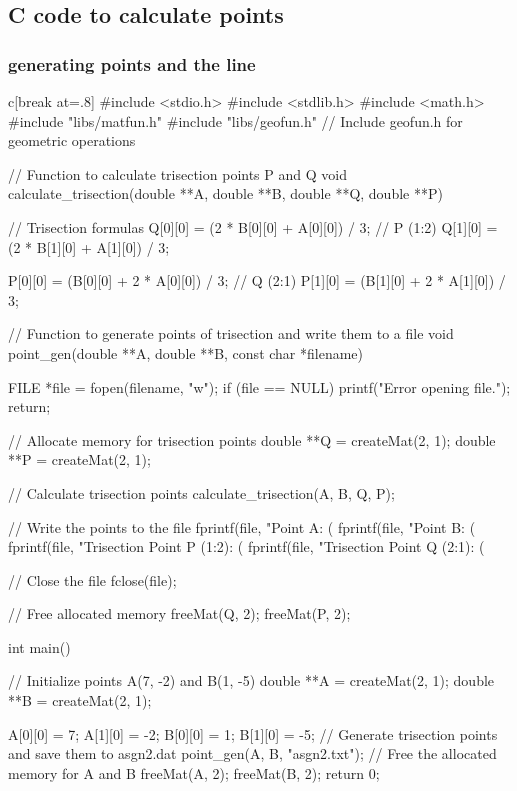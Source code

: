 \documentclass{beamer}
\theoremstyle{remark}
\numberwithin{equation}{section}
\begin{document}
\subsection{C code to calculate points}
\begin{frame}
\frametitle{generating points and the line}
\begin{mintedbox}{c}[break at=.8\textheight]
#include <stdio.h>
#include <stdlib.h>
#include <math.h>
#include "libs/matfun.h"
#include "libs/geofun.h"  // Include geofun.h for geometric operations

// Function to calculate trisection points P and Q
void calculate_trisection(double **A, double **B, double **Q, double **P) {
    // Trisection formulas
    Q[0][0] = (2 * B[0][0] + A[0][0]) / 3;  // P (1:2)
    Q[1][0] = (2 * B[1][0] + A[1][0]) / 3;

    P[0][0] = (B[0][0] + 2 * A[0][0]) / 3;  // Q (2:1)
    P[1][0] = (B[1][0] + 2 * A[1][0]) / 3;
}

// Function to generate points of trisection and write them to a file
void point_gen(double **A, double **B, const char *filename) {
    FILE *file = fopen(filename, "w");
    if (file == NULL) {
        printf("Error opening file.\n");
        return;
    }

    // Allocate memory for trisection points
    double **Q = createMat(2, 1);
    double **P = createMat(2, 1);

    // Calculate trisection points
    calculate_trisection(A, B, Q, P);

    // Write the points to the file
    fprintf(file, "Point A: (%
    fprintf(file, "Point B: (%
    fprintf(file, "Trisection Point P (1:2): (%
    fprintf(file, "Trisection Point Q (2:1): (%

    // Close the file
    fclose(file);

    // Free allocated memory
    freeMat(Q, 2);
    freeMat(P, 2);
}

int main() {
    // Initialize points A(7, -2) and B(1, -5)
    double **A = createMat(2, 1);
    double **B = createMat(2, 1);

    A[0][0] = 7;
    A[1][0] = -2;
    B[0][0] = 1;
    B[1][0] = -5;
    // Generate trisection points and save them to asgn2.dat
    point_gen(A, B, "asgn2.txt");
    // Free the allocated memory for A and B
    freeMat(A, 2);
    freeMat(B, 2);
    return 0;}
\end{mintedbox}
\end{frame}
\end{document}
